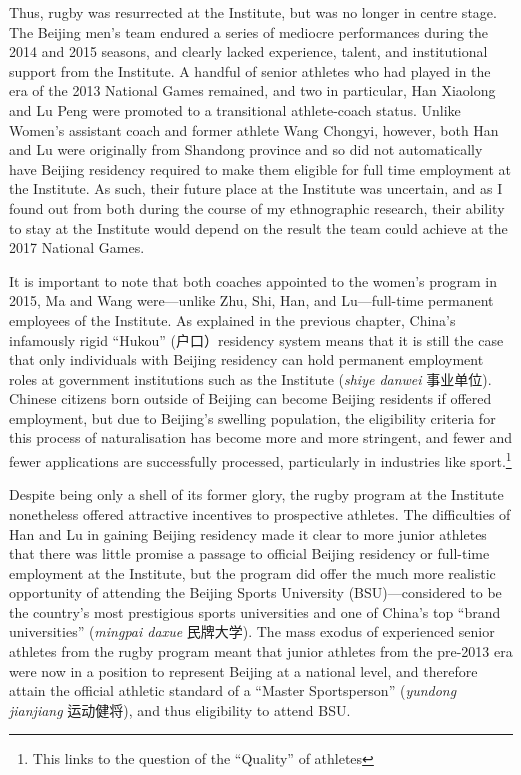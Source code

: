 \begin{CJK}{UTF8}{gbsn}
Thus, rugby was resurrected at the Institute, but was no longer in centre stage. The Beijing men's team endured a series of mediocre performances during the 2014 and 2015 seasons, and clearly lacked experience, talent, and institutional support from the Institute.  A handful of senior athletes who had played in the era of the 2013 National Games remained, and two in particular, Han Xiaolong and Lu Peng were promoted to a transitional athlete-coach status. Unlike Women's assistant coach and former athlete Wang Chongyi, however, both Han and Lu were originally from Shandong province and so did not automatically have Beijing residency required to make them eligible for full time employment at the Institute. As such, their future place at the Institute was uncertain, and as I found out from both during the course of my ethnographic research, their ability to stay at the Institute would depend on the result the team could achieve at the 2017 National Games.

It is important to note that both coaches appointed to the women's program in 2015, Ma and Wang were---unlike Zhu, Shi, Han, and Lu---full-time permanent employees of the Institute. As explained in the previous chapter, China's infamously rigid ``Hukou'' (户口）residency system means that it is still the case that only individuals with Beijing residency can hold permanent employment roles at government institutions such as the Institute (\textit{shiye danwei} 事业单位).  Chinese citizens born outside of Beijing can become Beijing residents if offered employment, but due to Beijing's swelling population, the eligibility criteria for this process of naturalisation has become more and more stringent, and fewer and fewer applications are successfully processed, particularly in industries like sport.\footnote{This links to the question of the ``Quality'' of athletes}

Despite being only a shell of its former glory, the rugby program at the Institute nonetheless offered attractive incentives to prospective athletes.  The difficulties of Han and Lu in gaining Beijing residency made it clear to more junior athletes that there was little promise a passage to official Beijing residency or full-time employment at the Institute, but the program did offer the much more realistic opportunity of attending the Beijing Sports University (BSU)---considered to be the country's most prestigious sports universities and one of China's top ``brand universities'' (\textit{mingpai daxue} 民牌大学).  The mass exodus of experienced senior athletes from the rugby program meant that junior athletes from the pre-2013 era were now in a position to represent Beijing at a national level, and therefore attain the official athletic standard of a ``Master Sportsperson'' (\textit{yundong jianjiang} 运动健将), and thus eligibility to attend BSU.



\end{CJK}
